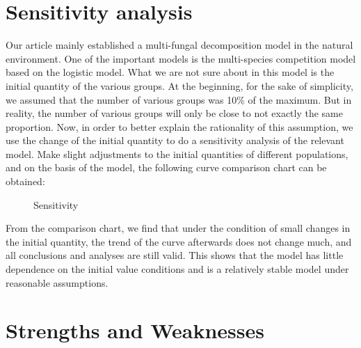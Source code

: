 \documentclass{mcmthesis}
\begin{document}
\section{Sensitivity analysis}
Our article mainly established a multi-fungal decomposition model in the natural environment. One of the important models is the multi-species competition model based on the logistic model. What we are not sure about in this model is the initial quantity of the various groups. At the beginning, for the sake of simplicity, we assumed that the number of various groups was 10\% of the maximum. But in reality, the number of various groups will only be close to not exactly the same proportion. Now, in order to better explain the rationality of this assumption, we use the change of the initial quantity to do a sensitivity analysis of the relevant model. Make slight adjustments to the initial quantities of different populations, and on the basis of the model, the following curve comparison chart can be obtained:
\begin{figure}[h]
	\caption{Sensitivity}
\end{figure}

From the comparison chart, we find that under the condition of small changes in the initial quantity, the trend of the curve afterwards does not change much, and all conclusions and analyses are still valid. This shows that the model has little dependence on the initial value conditions and is a relatively stable model under reasonable assumptions.

\section{Strengths and Weaknesses}
\end{document}
